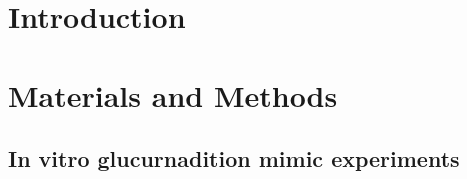 \section{Introduction}





\section{Materials and Methods}
	\subsection{In vitro glucurnadition mimic experiments}
	
